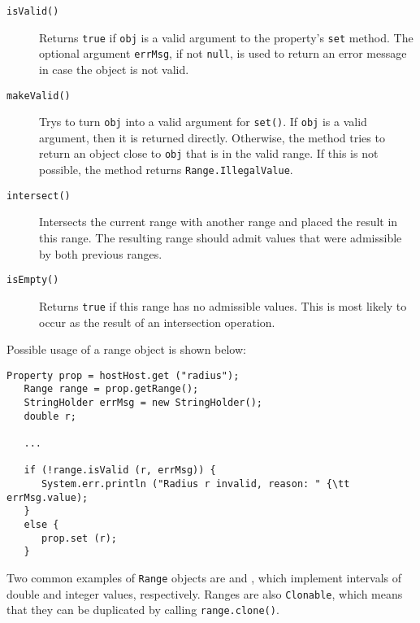 \begin{description}

\item[{\tt isValid()} ] \mbox{}

Returns {\tt true} if {\tt obj} is a valid
argument to the property's {\tt set} method. The optional
argument {\tt errMsg}, if not {\tt null}, is used to return
an error message in case the object is not valid.

\item[{\tt makeValid()} ] \mbox{}

Trys to turn {\tt obj} into a valid argument for {\tt set()}. If
{\tt obj} is a valid argument, then it is returned directly. Otherwise,
the method tries to return an object close to {\tt obj} that is in the
valid range. If this is not possible, the method returns
{\tt Range.IllegalValue}.

\item[{\tt intersect()} ] \mbox{}

Intersects the current range with another range and
placed the result in this range. The resulting range should admit values
that were admissible by both previous ranges.

\item[{\tt isEmpty()} ] \mbox{}

Returns {\tt true} if this range has no admissible values.
This is most likely to occur as the result of an intersection
operation.

\end{description}

Possible usage of a range object is shown below:

\begin{lstlisting}[]
   Property prop = hostHost.get ("radius");
   Range range = prop.getRange();
   StringHolder errMsg = new StringHolder();
   double r;

   ...

   if (!range.isValid (r, errMsg)) {
      System.err.println ("Radius r invalid, reason: " {\tt  errMsg.value);
   }
   else {
      prop.set (r);
   }
\end{lstlisting}

Two common examples of {\tt Range} objects are 
 and
, 
which implement intervals of double and integer
values, respectively.  Ranges are also {\tt Clonable}, which means that
they can be duplicated by calling {\tt range.clone()}.

